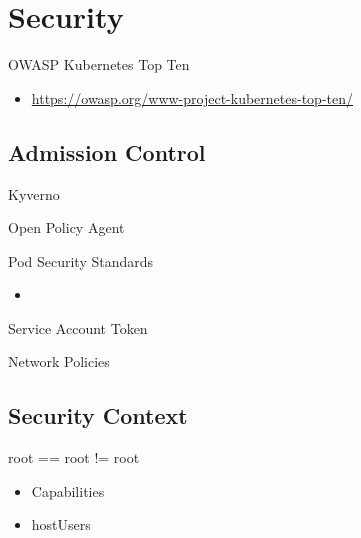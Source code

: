 \documentclass{dcpresentation}
\begin{document}
\section{Security}

\begin{frame}{OWASP Kubernetes Top Ten}
 \begin{itemize}
  \item \url{https://owasp.org/www-project-kubernetes-top-ten/}
  
 \end{itemize}

\end{frame}

\subsection{Admission Control}

\begin{frame}{Kyverno}

\end{frame}

\begin{frame}{Open Policy Agent}

\end{frame}

\begin{frame}{Pod Security Standards}
 \begin{itemize}
  \item 
 \end{itemize}
\end{frame}

\begin{frame}
 Service Account Token
 
\end{frame}

\begin{frame}
 Network Policies 
\end{frame}

\subsection{Security Context}

\begin{frame}{root == root != root}
 \begin{itemize}
  \item Capabilities
  \item hostUsers
 \end{itemize}
\end{frame}
\end{document}
